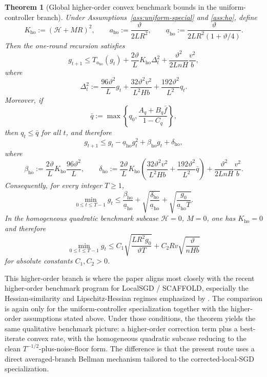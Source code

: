\documentclass{article}
\newtheorem{theorem}{Theorem}[section]
\theoremstyle{definition}
\begin{document}
\begin{theorem}[Global higher-order convex benchmark bounds in the uniform-controller branch]

Under Assumptions~\ref{ass:uniform-special} and \ref{ass:ho}, define
\[
K_{\mathrm{ho}}:=(\mathcal H+MR)^2,
\qquad
a_{\mathrm{ho}}:=\frac{\vartheta}{2LR^2},
\qquad
\underline a_{\mathrm{ho}}:=\frac{\vartheta}{2LR^2(1+\vartheta/4)}.
\]
Then the one-round recursion satisfies
\[
g_{t+1}
\le
T_{a_{\mathrm{ho}}}(g_t)
+
\frac{2\vartheta}{L}K_{\mathrm{ho}}\Delta_t^2
+
\frac{\vartheta^2}{2L n H}\frac{v^2}{b},
\]
where
\[
\Delta_t^2
:=
\frac{96\vartheta^2}{L}g_t
+
\frac{32\vartheta^2 v^2}{L^2 H b}
+
\frac{192\vartheta^2}{L^2}q_t.
\]
Moreover, if
\[
\bar q
:=
\max\left\{q_0,\frac{A_q+B_q\bar f}{1-C_q}\right\},
\]
then $q_t\le \bar q$ for all $t$, and therefore
\[
g_{t+1}
\le
g_t
-
\underline a_{\mathrm{ho}} g_t^2
+
\beta_{\mathrm{ho}} g_t
+
\delta_{\mathrm{ho}},
\]
where
\[
\beta_{\mathrm{ho}}
:=
\frac{2\vartheta}{L}K_{\mathrm{ho}}\frac{96\vartheta^2}{L},
\qquad
\delta_{\mathrm{ho}}
:=
\frac{2\vartheta}{L}K_{\mathrm{ho}}
\left(
\frac{32\vartheta^2 v^2}{L^2 H b}+
\frac{192\vartheta^2}{L^2}\bar q
\right)
+
\frac{\vartheta^2}{2L n H}\frac{v^2}{b}.
\]
Consequently, for every integer $T\ge 1$,
\[
\min_{0\le t\le T-1} g_t
\le
\frac{\beta_{\mathrm{ho}}}{\underline a_{\mathrm{ho}}}
+
\sqrt{\frac{\delta_{\mathrm{ho}}}{\underline a_{\mathrm{ho}}}}
+
\sqrt{\frac{g_0}{\underline a_{\mathrm{ho}}T}}.
\]
In the homogeneous quadratic benchmark subcase
$\mathcal H=0$, $M=0$,
one has $K_{\mathrm{ho}}=0$ and therefore
\[
\min_{0\le t\le T-1} g_t
\le
C_1\sqrt{\frac{L R^2 g_0}{\vartheta T}}
+
C_2 R v\sqrt{\frac{\vartheta}{n H b}}
\]
for absolute constants $C_1,C_2>0$.
\end{theorem}

This higher-order branch is where the paper aligns most closely with the
recent higher-order benchmark program for LocalSGD / SCAFFOLD, especially the
Hessian-similarity and Lipschitz-Hessian regimes emphasized by
\citet{luo2025revisiting}. The comparison is again only for the
uniform-controller specialization together with the higher-order assumptions
stated above. Under those conditions, the theorem yields the same qualitative
benchmark picture: a higher-order correction term plus a best-iterate convex
rate, with the homogeneous quadratic subcase reducing to the clean
$T^{-1/2}$-plus-noise-floor form. The difference is that the present route uses
a direct averaged-branch Bellman mechanism tailored to the corrected-local-SGD
specialization.
\end{document}
